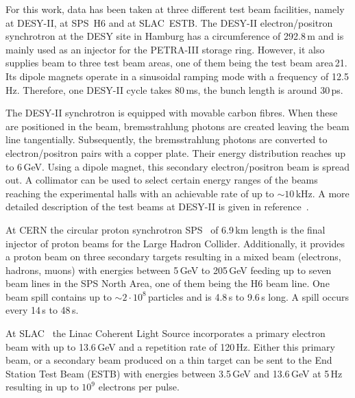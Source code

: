 
For this work, data has been taken at three different test beam facilities, namely at {DESY-II}, at SPS~H6 and at SLAC~ESTB.
The DESY-II electron/positron synchrotron at the DESY site in Hamburg has a circumference of 292.8\,m and is mainly used as an injector for the PETRA-III storage ring. 
However, it also supplies beam to three test beam areas, one  of them being the test beam area\,21.
Its dipole magnets operate in a sinusoidal ramping mode with a frequency of 12.5\,Hz. 
Therefore, one DESY-II cycle takes 80\,ms, the bunch length is around 30\,ps. 

The DESY-II synchrotron is equipped with movable carbon fibres. 
When these are positioned in the beam, bremsstrahlung photons are created leaving the beam line tangentially.
Subsequently, the bremsstrahlung photons are converted to electron/positron pairs with a copper plate. 
Their energy distribution reaches up to 6\,GeV. 
Using a dipole magnet, this secondary electron/positron beam is spread out.
A collimator can be used to select certain energy ranges of the beams reaching the experimental halls with an achievable rate of up to $\sim 10$\,kHz. 
A more detailed description of the test beams at {DESY-II} is given in reference~\cite{EUDET-2007-11}.

At CERN the circular proton synchrotron SPS~\cite{SPS} of 6.9\,km length is the final injector of proton beams for the Large Hadron Collider. 
Additionally, it provides a proton beam on three secondary targets resulting in a mixed beam (electrons, hadrons, muons) with energies between 5\,GeV to 205\,GeV
 feeding up to seven beam lines in the SPS North Area, one of them being the H6 beam line. 
One beam spill contains up to $\sim 2\cdot10^8$\,particles and is 4.8\,s to 9.6\,s long. 
A spill occurs every 14\,s to 48\,s.

At SLAC~\cite{SLAC} the Linac Coherent Light Source incorporates a primary electron beam with up to 13.6\,GeV and a repetition rate of 120\,Hz.
Either this primary beam, or a secondary beam produced on a thin target can be sent to the End Station Test Beam (ESTB) with energies between 3.5\,GeV and 13.6\,GeV at 5\,Hz
 resulting in up to $10^{9}$ electrons per pulse.

